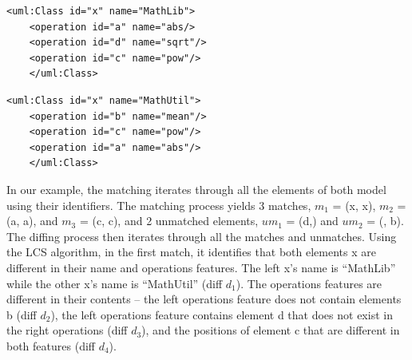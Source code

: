 \documentclass{jot}
\begin{document}
\vspace{-10pt}
\begin{minipage}[t]{0.49\linewidth} 
    \begin{lstlisting}[style=eol,caption={The simplified XMI of the left model in Fig. \ref{fig:left}.},label=lst:leftxmi]
    <uml:Class id="x" name="MathLib">
    <operation id="a" name="abs/>
    <operation id="d" name="sqrt"/>
    <operation id="c" name="pow"/>
    </uml:Class>
    \end{lstlisting}
\end{minipage}
\hfill
\begin{minipage}[t]{0.49\linewidth}
    \begin{lstlisting}[style=eol,caption={The simplified XMI of the right model in Fig. \ref{fig:right}.},label=lst:rightxmi]
    <uml:Class id="x" name="MathUtil">
    <operation id="b" name="mean"/>
    <operation id="c" name="pow"/>
    <operation id="a" name="abs"/>
    </uml:Class>
    \end{lstlisting}
\end{minipage}

In our example, the matching iterates through all the elements of both model using their identifiers. The matching process yields 3 matches, $m_1$ = (\textsf{x}, \textsf{x}), $m_2$ = (\textsf{a}, \textsf{a}), and $m_3$ = (\textsf{c}, \textsf{c}), and 2 unmatched elements, $um_1$ = (\textsf{d},) and $um_2$ = (, \textsf{b}). The diffing process then iterates through all the matches and unmatches. Using the LCS algorithm, in the first match, it identifies that both elements \textsf{x} are different in their \textsf{name} and \textsf{operations} features. 
The left \textsf{x}'s \textsf{name} is ``MathLib'' while the other \textsf{x}'s \textsf{name} is ``MathUtil'' (diff $d_1$). The \textsf{operations} features are different in their contents -- the left \textsf{operations} feature does not contain elements \textsf{b} (diff $d_2$), the left \textsf{operations} feature contains element \textsf{d} 
that does not exist in the right \textsf{operations} (diff $d_3$), and the positions of element \textsf{c} that are different in both features (diff $d_4$).
\end{document}
